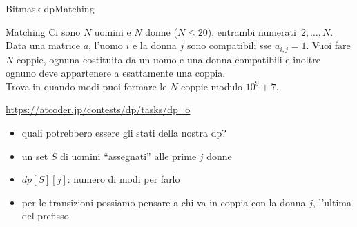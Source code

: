 \documentclass{beamer}
\begin{document}
\begin{frame}
\end{frame}


\begin{frame}{Bitmask dp}{Matching}
    \begin{exampleblock}{Matching}
        Ci sono $N$ uomini e $N$ donne ($N \leq 20$), entrambi numerati $\, 2, \dots, N$. Data una matrice $a$, l'uomo $i$ e la donna $j$ sono compatibili sse $a_{i,j} = 1$.
        Vuoi fare $N$ coppie, ognuna costituita da un uomo e una donna compatibili e inoltre ognuno deve appartenere a esattamente una coppia. \\
        Trova in quando modi puoi formare le $N$ coppie modulo $10^9 + 7$.
    \end{exampleblock}
    \small{\underline{\url{https://atcoder.jp/contests/dp/tasks/dp_o}}}
    \pause
    \begin{itemize}
        \item quali potrebbero essere gli stati della nostra dp?
        \pause
        \item un set $S$ di uomini ``assegnati'' alle prime $j$ donne
        \item $dp[S][j]$: numero di modi per farlo
        \pause
        \item per le transizioni possiamo pensare a chi va in coppia con la donna $j$, l'ultima del prefisso
    \end{itemize}
\end{frame}
\end{document}
